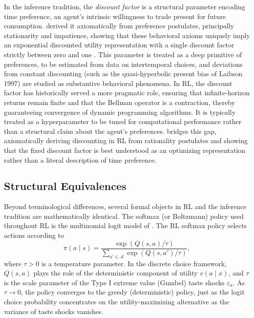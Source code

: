 In the inference tradition, the \textit{discount factor} is a structural parameter encoding time preference, an agent's intrinsic willingness to trade present for future consumption. \citet{Koopmans1960} derived it axiomatically from preference postulates, principally stationarity and impatience, showing that these behavioral axioms uniquely imply an exponential discounted utility representation with a single discount factor strictly between zero and one \citep{Bleichrodt2008}. This parameter is treated as a deep primitive of preferences, to be estimated from data on intertemporal choices, and deviations from constant discounting (such as the quasi-hyperbolic present bias of Laibson 1997) are studied as substantive behavioral phenomena. In RL, the discount factor has historically served a more pragmatic role, ensuring that infinite-horizon returns remain finite and that the Bellman operator is a contraction, thereby guaranteeing convergence of dynamic programming algorithms. It is typically treated as a hyperparameter to be tuned for computational performance rather than a structural claim about the agent's preferences. \citet{Pitis2019} bridges this gap, axiomatically deriving discounting in RL from rationality postulates and showing that the fixed discount factor is best understood as an optimizing representation rather than a literal description of time preference.

\subsection{Structural Equivalences}
\label{subsec:structural_equivalences}

Beyond terminological differences, several formal objects in RL and the inference tradition are mathematically identical. The softmax (or Boltzmann) policy used throughout RL is the multinomial logit model of \citet{McFadden1974}. The RL softmax policy selects actions according to
\begin{equation}
\label{eq:softmax_logit}
\pi(a \mid s) = \frac{\exp(Q(s,a) / \tau)}{\sum_{a' \in \mathcal{A}} \exp(Q(s,a') / \tau)},
\end{equation}
where $\tau > 0$ is a temperature parameter. In the discrete choice framework, $Q(s,a)$ plays the role of the deterministic component of utility $v(a \mid x)$, and $\tau$ is the scale parameter of the Type I extreme value (Gumbel) taste shocks $\varepsilon_a$. As $\tau \to 0$, the policy converges to the greedy (deterministic) policy, just as the logit choice probability concentrates on the utility-maximizing alternative as the variance of taste shocks vanishes.

